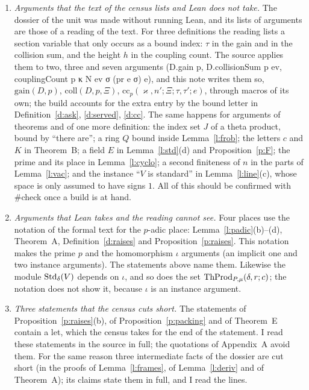 \documentclass[11pt,a4paper]{article}
\newcommand{\leanfont}{\ttfamily\fontsize{8.6}{10.5}\selectfont\color{leancol}}
\theoremstyle{plainx}
\theoremstyle{uprightx}
\newcommand{\lnm}[1]{{\leanfont #1}}
\newcommand{\gain}[2]{\mathrm{gain}(#1,#2)}
\newcommand{\coll}[3]{\mathrm{coll}(#1,#2,#3)}
\newcommand{\cc}[7]{\mathrm{cc}_{#1}(#2,#3;#4;#5,#6;#7)}
\begin{document}
\begin{enumerate}[label=\textup{\arabic*.},leftmargin=1.6em,itemsep=5pt]
\item \emph{Arguments that the text of the census lists and Lean does not take.} The dossier of the unit was made
without running Lean, and its lists of arguments are those of a reading of the text. For three definitions the
reading lists a section variable that only occurs as a bound index: $\tau$ in the gain and in the collision sum,
and the height $h$ in the coupling count. The source applies them to two, three and seven arguments
(\lnm{D.gain p}, \lnm{D.collisionSum p ev}, \lnm{couplingCount p κ N ev σ (pr e σ) e}), and this note writes them
so, $\gain{D}{p}$, $\coll{D}{p}{\Xi}$, $\cc{p}{\varkappa}{n'}{\Xi}{\tau}{\tau'}{e}$, through macros of its own; the
build accounts for the extra entry by the bound letter in Definition~\ref{d:ask}, \ref{d:served}, \ref{d:cc}. The
same happens for arguments of theorems and of one more definition: the index set $J$ of a theta product, bound by
``there are''; a ring $Q$ bound inside Lemma~\ref{l:frob}; the letters $c$ and $K$ in Theorem~B; a field $E$ in
Lemma~\ref{l:std}(d) and Proposition~\ref{p:F}; the prime and its place in Lemma~\ref{l:cyclo}; a second
finiteness of $n$ in the parts of Lemma~\ref{l:vac}; and the instance ``$V$ is standard'' in
Lemma~\ref{l:line}(c), whose space is only assumed to have signs $1$. All of this should be confirmed with
\lnm{\#check} once a build is at hand.
\item \emph{Arguments that Lean takes and the reading cannot see.} Four places use the notation of the formal
text for the $p$-adic place: Lemma~\ref{l:padic}(b)--(d), Theorem~A, Definition~\ref{d:raises} and
Proposition~\ref{p:raises}. This notation makes the prime $p$ and the homomorphism $\iota$ arguments (an implicit one
and two instance arguments). The statements above name them. Likewise the module $\mathrm{Std}_{\delta}(V)$ depends on $\iota$, and so does
the set $\mathrm{ThProd}_{P,\mu}(\delta,r;c)$; the notation does not show it, because $\iota$ is an instance argument.
\item \emph{Three statements that the census cuts short.} The statements of Proposition~\ref{p:raises}(b), of
Proposition~\ref{p:packing} and of Theorem~E contain a \lnm{let}, which the census takes for the end of the
statement. I read these statements in the source in full; the quotations of Appendix~A avoid them. For the same
reason three intermediate facts of the dossier are cut short (in the proofs of Lemma~\ref{l:frames}, of
Lemma~\ref{l:deriv} and of Theorem~A); its claims state them in full, and I read the lines.

\end{enumerate}
\end{document}
